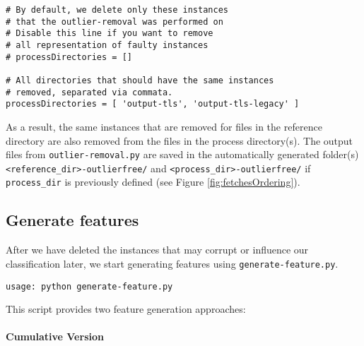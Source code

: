 \begin{verbatim}
# By default, we delete only these instances 
# that the outlier-removal was performed on
# Disable this line if you want to remove 
# all representation of faulty instances
# processDirectories = []

# All directories that should have the same instances 
# removed, separated via commata.
processDirectories = [ 'output-tls', 'output-tls-legacy' ]
\end{verbatim}
As a result, the same instances that are removed for files in the reference directory are also removed from the files in the process directory(s). The output files from \texttt{outlier-removal.py} are saved in the automatically generated folder(s) \texttt{<reference\_dir>-outlierfree/} and \texttt{<process\_dir>-outlierfree/} if \texttt{process\_dir} is previously defined (see Figure \ref{fig:fetchesOrdering}).

\subsection{Generate features}

After we have deleted the instances that may corrupt or influence our classification later, we start generating features using \texttt{generate-feature.py}.
\begin{verbatim}
usage: python generate-feature.py
\end{verbatim}
This script provides two feature generation approaches:

\paragraph{Cumulative Version}
\label{par:cumulative_version}

